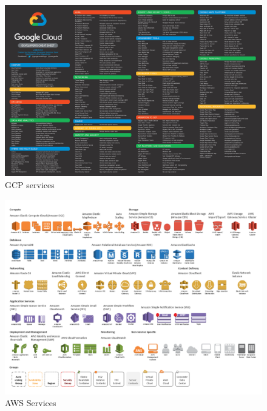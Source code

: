\documentclass{IEEEtran}
\begin{document}
\begin{figure}[h!]
  \centering
  \includegraphics[scale=0.1]{imgs/gcp_services.jpg}
  \caption{GCP services}
  \label{fig:gcp-services}
\end{figure} 
\begin{figure}[h!]
  \centering
  \includegraphics[scale=0.18]{imgs/aws-toolkit.png}
  \caption{AWS Services}
  \label{fig:aws-services}
\end{figure} 

\end{document}
